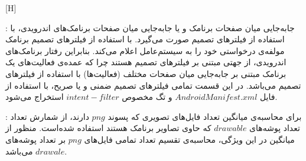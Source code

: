 [H]
\vspace{1em}

: جابه‌جایی میان صفحات برنامک و یا جابه‌جایی میان صفحات برنامک‌های اندرویدی، با استفاده از فیلتر‌های تصمیم صورت می‌گیرد. با استفاده از فیلتر‌های تصمیم برنامک مولفه‌ی درخواستی خود را به سیستم‌عامل اعلام می‌کند. بنابراین رفتار برنامک‌های اندرویدی، از جهتی مبتنی بر فیلتر‌های تصمیم هستند چرا که عمده‌ی فعالیت‌های یک برنامک مبتنی بر جابه‌جایی میان صفحات مختلف (فعالیت‌ها) با استفاده از فیلتر‌های تصمیم می‌باشد. در این قسمت تمامی فیلتر‌های تصمیم ضمنی و یا صریح، با استفاده از فایل $AndroidManifest.xml$ و تگ مخصوص $intent-filter$ استخراج می‌شود.

: برای محاسبه‌ی میانگین تعداد فایل‌های تصویری که پسوند $png$ دارند، از شمارش تعداد تعداد پوشه‌های $drawable$ که حاوی تصاویر برنامک هستند استفاده شده‌است. منظور از میانگین در این ویژگی، محاسبه‌ی تقسیم تعداد تمامی فایل‌های $png$ بر تعداد پوشه‌های $drawale$ می‌باشد.

